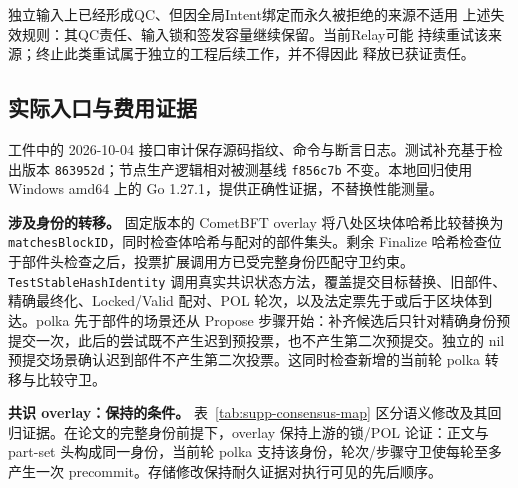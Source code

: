独立输入上已经形成QC、但因全局Intent绑定而永久被拒绝的来源不适用
上述失效规则：其QC责任、输入锁和签发容量继续保留。当前Relay可能
持续重试该来源；终止此类重试属于独立的工程后续工作，并不得因此
释放已获证责任。

\subsection{实际入口与费用证据}
\label{supp:interface-fee-evidence}
工件中的 2026-10-04 接口审计保存源码指纹、命令与断言日志。测试补充基于检出版本 \texttt{863952d}；节点生产逻辑相对被测基线 \texttt{f856c7b} 不变。本地回归使用 Windows amd64 上的 Go 1.27.1，提供正确性证据，不替换性能测量。

\noindent\textbf{涉及身份的转移。}
固定版本的 CometBFT overlay 将八处区块体哈希比较替换为 \texttt{matches\allowbreak BlockID}，同时检查体哈希与配对的部件集头。剩余 Finalize 哈希检查位于部件头检查之后，投票扩展调用方已受完整身份匹配守卫约束。\texttt{Test\allowbreak Stable\allowbreak Hash\allowbreak Identity} 调用真实共识状态方法，覆盖提交目标替换、旧部件、精确最终化、Locked/Valid 配对、POL 轮次，以及法定票先于或后于区块体到达。polka 先于部件的场景还从 Propose 步骤开始：补齐候选后只针对精确身份预提交一次，此后的尝试既不产生迟到预投票，也不产生第二次预提交。独立的 nil 预提交场景确认迟到部件不产生第二次投票。这同时检查新增的当前轮 polka 转移与比较守卫。

\noindent\textbf{共识 overlay：保持的条件。}
表~\ref{tab:supp-consensus-map} 区分语义修改及其回归证据。在论文的完整身份前提下，overlay 保持上游的锁/POL 论证：正文与 part-set 头构成同一身份，当前轮 polka 支持该身份，轮次/步骤守卫使每轮至多产生一次 precommit。存储修改保持耐久证据对执行可见的先后顺序。

